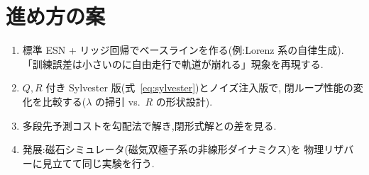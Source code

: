 \documentclass[a4paper,11pt]{ltjsarticle}
\begin{document}
\section{進め方の案}

\begin{enumerate}
  \item 標準 ESN + リッジ回帰でベースラインを作る(例:Lorenz 系の自律生成).
        「訓練誤差は小さいのに自由走行で軌道が崩れる」現象を再現する.
  \item $Q, R$ 付き Sylvester 版(式~\eqref{eq:sylvester})とノイズ注入版で,
        閉ループ性能の変化を比較する($\lambda$ の掃引 vs.\ $R$ の形状設計).
  \item 多段先予測コストを勾配法で解き,閉形式解との差を見る.
  \item 発展:磁石シミュレータ(磁気双極子系の非線形ダイナミクス)を
        物理リザバーに見立てて同じ実験を行う.
\end{enumerate}
\end{document}

